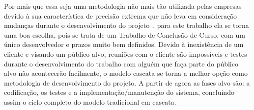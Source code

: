Por mais que essa seja uma metodologia não mais tão utilizada pelas empresas devido à sua característica de precisão extrema que não leva em consideração mudanças durante o desenvolvimento do projeto~\cite{BALTZAN1}, para este trabalho ela se torna uma boa escolha, pois se trata de um Trabalho de Conclusão de Curso, com um único desenvolvedor e prazos muito bem definidos.
Devido à inexistência de um cliente e visando um público alvo, reuniões com o cliente são impossíveis e testes durante o desenvolvimento do trabalho com alguém que faça parte do público alvo não acontecerão facilmente, o modelo cascata se torna a melhor opção como metodologia de desenvolvimento do projeto.
A partir de agora as fases alvo são: a codificação, os testes e a implementação/manutenção do sistema, concluindo assim o ciclo completo do modelo tradicional em cascata.



